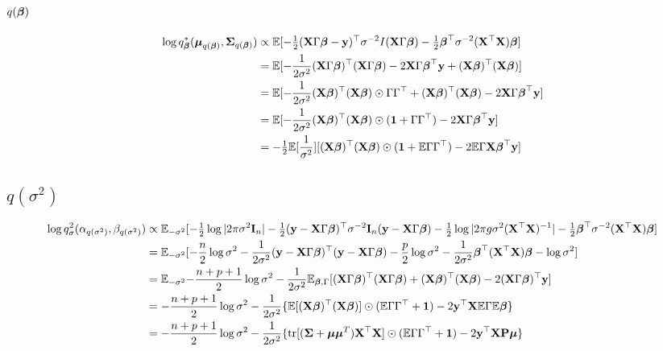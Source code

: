 \documentclass{amsart}[12pt]
\begin{document}
\subsection{$q({\boldsymbol \beta})$}
\begin{align*}
\log q_{\boldsymbol \beta}^*({\boldsymbol \mu}_{q({\boldsymbol \beta})}, {\boldsymbol \Sigma}_{q({\boldsymbol \beta})}) &\propto \mathbb{E}[-\tfrac{1}{2} ({\bf X} \Gamma {\boldsymbol\beta} - {\bf y})^\top \sigma^{-2} I ({\bf X} \Gamma {\boldsymbol\beta}) - \tfrac{1}{2} {\boldsymbol \beta}^\top \sigma^{-2} ({\bf X}^\top {\bf X}) {\boldsymbol \beta}] \\
&= \mathbb{E}[-\frac{1}{2 \sigma^2} ({\bf X} \Gamma {\boldsymbol\beta})^\top ({\bf X} \Gamma {\boldsymbol\beta}) - 2 {\bf X} \Gamma {\boldsymbol\beta}^\top {\bf y} + ({\bf X} {\boldsymbol \beta})^\top ({\bf X} {\boldsymbol \beta})] \\
&= \mathbb{E}[-\frac{1}{2 \sigma^2} ({\bf X} {\boldsymbol \beta})^\top ({\bf X} {\boldsymbol \beta}) \odot \Gamma \Gamma^\top + ({\bf X} {\boldsymbol \beta})^\top ({\bf X} {\boldsymbol \beta}) - 2 {\bf X} \Gamma {\boldsymbol\beta}^\top {\bf y}] \\
&= \mathbb{E}[-\frac{1}{2 \sigma^2} ({\bf X} {\boldsymbol \beta})^\top ({\bf X} {\boldsymbol \beta}) \odot ({\bf 1} + \Gamma \Gamma^\top) - 2 {\bf X} \Gamma {\boldsymbol\beta}^\top {\bf y}] \\
&= -\tfrac{1}{2} \mathbb{E}[\frac{1}{\sigma^2}] [({\bf X} {\boldsymbol \beta})^\top ({\bf X} {\boldsymbol \beta}) \odot ({\bf 1} + \mathbb{E} \Gamma \Gamma^\top) - 2 \mathbb{E} \Gamma {\bf X} {\boldsymbol\beta}^\top {\bf y}]
\end{align*}

\subsection{$q(\sigma^2)$}
\begin{align*}
\log q_\sigma^2(\alpha_{q(\sigma^2)}, \beta_{q(\sigma^2)}) &\propto \mathbb{E}_{-\sigma^2} [-\tfrac{1}{2} \log |2 \pi \sigma^2 {\bf I}_n| - \tfrac{1}{2} ({\bf y} - {\bf X} \Gamma {\boldsymbol\beta})^\top \sigma^{-2} {\bf I}_n ({\bf y} - {\bf X} \Gamma {\boldsymbol\beta}) - \tfrac{1}{2} \log |2 \pi g \sigma^2 ({\bf X}^\top {\bf X})^{-1}| - \tfrac{1}{2} {\boldsymbol \beta}^\top \sigma^{-2} ({\bf X}^\top {\bf X}) {\boldsymbol \beta}] \\
&= \mathbb{E}_{-\sigma^2} [- \frac{n}{2} \log \sigma^2 - \frac{1}{2 \sigma^2}({\bf y} - {\bf X} \Gamma {\boldsymbol\beta})^\top({\bf y} - {\bf X} \Gamma {\boldsymbol\beta}) - \frac{p}{2} \log \sigma^2 - \frac{1}{2 \sigma^2} {\boldsymbol \beta}^\top ({\bf X}^\top {\bf X}) {\boldsymbol \beta} - \log \sigma^2] \\
&= \mathbb{E}_{-\sigma^2} {-\frac{n + p + 1}{2} \log \sigma^2 - \frac{1}{2\sigma^2} \mathbb{E}_{{\boldsymbol \beta}, \Gamma} [({\bf X} \Gamma {\boldsymbol\beta})^\top ({\bf X} \Gamma {\boldsymbol\beta}) + ({\bf X} {\boldsymbol \beta})^\top ({\bf X} {\boldsymbol \beta}) - 2 ({\bf X} \Gamma {\boldsymbol\beta})^\top {\bf y}]} \\
&= -\frac{n + p + 1}{2} \log \sigma^2 - \frac{1}{2 \sigma^2} \{\mathbb{E} [({\bf X} {\boldsymbol \beta})^\top ({\bf X} {\boldsymbol \beta})] \odot (\mathbb{E} \Gamma \Gamma^\top + {\bf 1}) - 2{\bf y}^\top {\bf X} \mathbb{E} \Gamma \mathbb{E} {\boldsymbol \beta}\}\\
&= -\frac{n + p + 1}{2} \log \sigma^2 - \frac{1}{2 \sigma^2} \{\text{tr}[({\boldsymbol \Sigma} + {\boldsymbol \mu} {\boldsymbol \mu}^T) {\bf X}^\top {\bf X}] \odot (\mathbb{E} \Gamma \Gamma^\top + {\bf 1}) - 2{\bf y}^\top {\bf X} {\bf P} {\boldsymbol\mu}\}\\
\end{align*}
\end{document}
